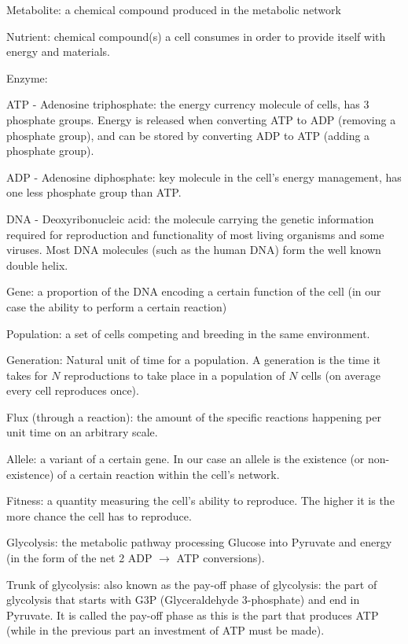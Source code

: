\documentclass[10pt,a4paper]{article}
\begin{document}
	\begin{framed}
		
	Metabolite: a chemical compound produced in the metabolic network

	Nutrient: chemical compound(s) a cell consumes in order to provide itself with energy and materials.

	Enzyme:

	ATP - Adenosine triphosphate: the energy currency molecule of cells, has 3 phosphate groups. Energy is released when converting ATP to ADP (removing a phosphate group), and can be stored by converting ADP to ATP (adding a phosphate group).

	ADP - Adenosine diphosphate: key molecule in the cell's energy management, has one less phosphate group than ATP.

	DNA - Deoxyribonucleic acid: the molecule carrying the genetic information required for reproduction and functionality of most living organisms and some viruses. Most DNA molecules (such as the human DNA) form the well known double helix. 

	Gene: a proportion of the DNA encoding a certain function of the cell (in our case the ability to perform a certain reaction)

	Population: a set of cells competing and breeding in the same environment.

	Generation: Natural unit of time for a population. A generation is the time it takes for $N$ reproductions to take place in a population of $N$ cells (on average every cell reproduces once).

	Flux (through a reaction): the amount of the specific reactions happening per unit time on an arbitrary scale. 

	Allele: a variant of a certain gene. In our case an allele is the existence (or non-existence) of a certain reaction within the cell's network.

	Fitness: a quantity measuring the cell's ability to reproduce. The higher it is the more chance the cell has to reproduce.

	Glycolysis: the metabolic pathway processing Glucose into Pyruvate and energy (in the form of the net 2 ADP $\rightarrow$ ATP conversions).

	Trunk of glycolysis: also known as the pay-off phase of glycolysis: the part of glycolysis that starts with G3P (Glyceraldehyde 3-phosphate) and end in Pyruvate. It is called the pay-off phase as this is the part that produces ATP (while in the previous part an investment of ATP must be made).

	\end{framed}
\end{document}

